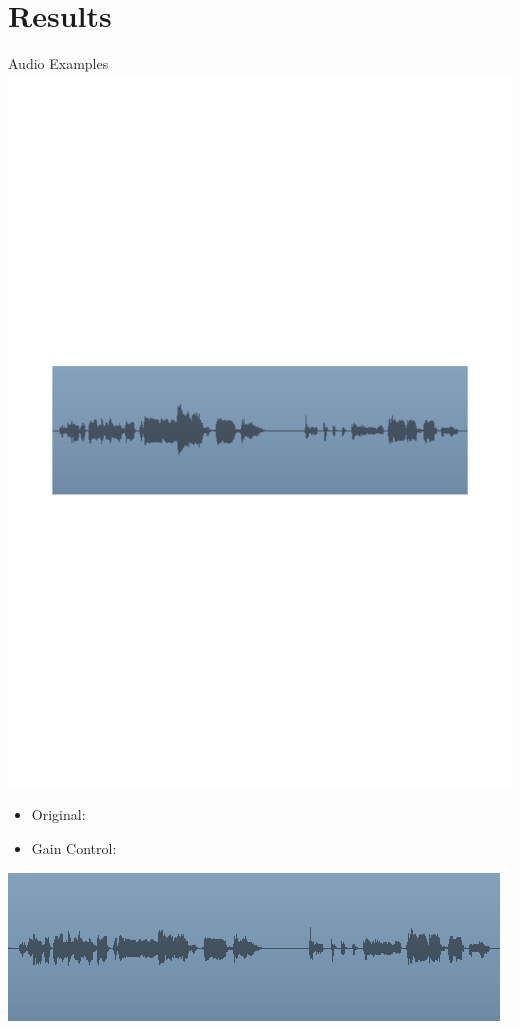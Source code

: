 \section{Results}


\begin{frame}[c, fragile]{Audio Examples}
	\includegraphics[scale=0.6]{images/wave}
	\centering
	\\
    \begin{itemize}
        \item Original: 
        \item Gain Control: 
    \end{itemize}
	\includegraphics[scale=0.6]{images/after}
	\centering
	\\
\end{frame}
